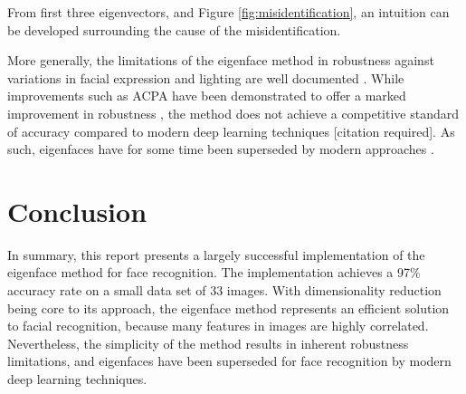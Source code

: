 
From first three eigenvectors, and Figure \ref{fig:misidentification}, an intuition can be developed surrounding the cause of the misidentification.

More generally, the limitations of the eigenface method in robustness against variations in facial expression and lighting are well documented \cite{lovell_2008}. While improvements such as ACPA have been demonstrated to offer a marked improvement in robustness \cite{lovell_2008}, the method does not achieve a competitive standard of accuracy compared to modern deep learning techniques [citation required]. As such, eigenfaces have for some time been superseded by modern approaches \cite{elec4630_2023}.

\section{Conclusion}

In summary, this report presents a largely successful implementation of the eigenface method for face recognition. The implementation achieves a 97\% accuracy rate on a small data set of 33 images. With dimensionality reduction being core to its approach, the eigenface method represents an efficient solution to facial recognition, because many features in images are highly correlated. Nevertheless, the simplicity of the method results in inherent robustness limitations, and eigenfaces have been superseded for face recognition by modern deep learning techniques.
